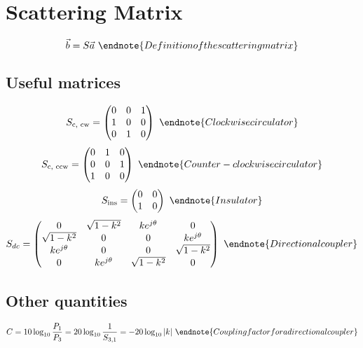 \section{Scattering Matrix}
$$ \vec{b} = S \vec{a} \
	\endnote{Definition of the scattering matrix}
	$$

\subsection{Useful matrices}
\begin{multicols}{2} \noindent
	$$ S_\text{c, cw} = \begin{pmatrix}
			0 & 0 & 1 \\
			1 & 0 & 0 \\
			0 & 1 & 0
		\end{pmatrix} \
		\endnote{Clockwise circulator}
		$$
	$$ S_\text{c, ccw} = \begin{pmatrix}
			0 & 1 & 0 \\
			0 & 0 & 1 \\
			1 & 0 & 0
		\end{pmatrix} \
		\endnote{Counter-clockwise circulator}
		$$
	$$ S_\text{ins} = \begin{pmatrix}
			0 & 0\\
			1 & 0
		\end{pmatrix} \
		\endnote{Insulator}
		$$
	$$ S_{dc} = \begin{pmatrix}
			0 				& \sqrt{1 - k^2} & k e^{j \theta} & 0 \\
			\sqrt{1 - k^2} 	& 0 			 & 0 			  &  k e^{j \theta} \\
			k e^{j \theta}  & 0 			 & 0 			  & \sqrt{1 - k^2} \\
			0 				& k e^{j \theta} & \sqrt{1 - k^2} & 0
		\end{pmatrix} \
		\endnote{Directional coupler}
		$$
\end{multicols}

\subsection{Other quantities}
\begin{multicols}{2}
	$$ C = 10 \log_{10}{\frac{P_1}{P_3}}
		= 20 \log_{10}{\frac{1}{S_{3,1}}}
		= -20 \log_{10}{|k|} \
		\endnote{Coupling factor for a directional coupler}
		$$
\end{multicols}
\printendnotes[itemize]
